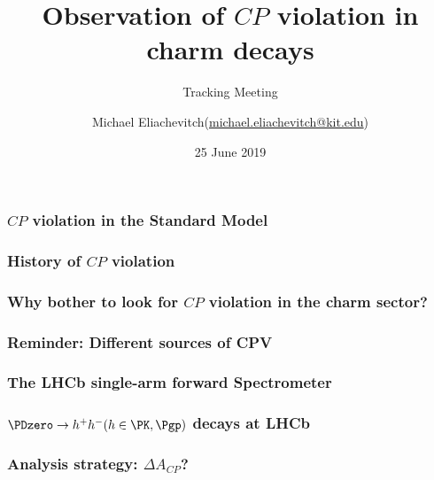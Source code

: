 \documentclass[18pt, aspectratio=169]{beamer}
\title{Observation of $CP$ violation in charm decays}
\subtitle{Tracking Meeting}
\author[Michael Eliachevitch
(\href{mailto:michael.eliachevitch@kit.edu}{michael.eliachevitch@kit.edu})]{Michael Eliachevitch(\href{mailto:michael.eliachevitch@kit.edu}{michael.eliachevitch@kit.edu})}
\institute[ETP -- KIT]{Institut für Experimentelle Teilchenphysik (ETP) -- KIT}
\date{25 June 2019}
\begin{document}
\maketitle

\begin{frame}
  \frametitle{$CP$ violation in the Standard Model}

\end{frame}


\begin{frame}
  \frametitle{History of $CP$ violation}

\end{frame}

\begin{frame}
  \frametitle{Why bother to look for $CP$ violation in the charm sector?}

\end{frame}

\begin{frame}
  \frametitle{Reminder: Different sources of CPV}

\end{frame}

\begin{frame}
  \frametitle{The LHCb single-arm forward Spectrometer}

\end{frame}

\begin{frame}
  \frametitle{$\PDzero \rightarrow h^+h^- (h \in {\PK, \Pgp})$ decays at LHCb}

\end{frame}

\begin{frame}
  \frametitle{Analysis strategy:  $\Delta A_{CP}$?}

\end{frame}
\end{document}
